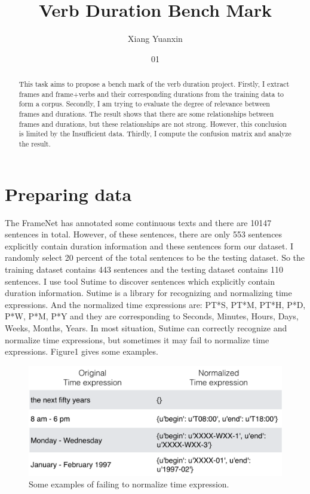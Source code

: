 \documentclass[11pt,a4paper]{article}
\title{Verb Duration Bench Mark}
\author{Xiang Yuanxin}
\date{01}
\begin{document}
\maketitle

\begin{abstract}
This task aims to propose a bench mark of the verb duration project. Firstly, I extract frames and frame+verbs and their corresponding durations from the training data to form a corpus. Secondly, I am trying to evaluate the degree of relevance between frames and durations. The result shows that there are some relationships between frames and durations, but these relationships are not strong. However, this conclusion is limited by the Insufficient data. Thirdly, I compute the confusion matrix and analyze the result. 
\end{abstract}


\section{Preparing data}

The FrameNet has annotated some continuous texts and there are 10147 sentences in total. However, of these sentences, there are only 553 sentences explicitly contain duration information and these sentences form our dataset. I randomly select 20 percent of the total sentences to be the testing dataset. So the training dataset contains 443 sentences and the testing dataset contains 110 sentences.
I use tool Sutime to discover sentences which explicitly contain duration information. Sutime is a library for recognizing and normalizing time expressions. And the normalized time expressions are: PT*S, PT*M, PT*H, P*D, P*W, P*M, P*Y and they are corresponding to Seconds, Minutes, Hours, Days, Weeks, Months, Years. In most situation, Sutime can correctly recognize and normalize time expressions, but sometimes it may fail to normalize time expressions. Figure1 gives some examples.



\begin{figure}[H] 
\begin{center} 
\includegraphics[width=\columnwidth]{figs/fig1.png}
\caption{Some examples of failing to normalize time expression.}
\label{first_fig}
\end{center}
\vskip -0.3in
\end{figure}
\end{document}
